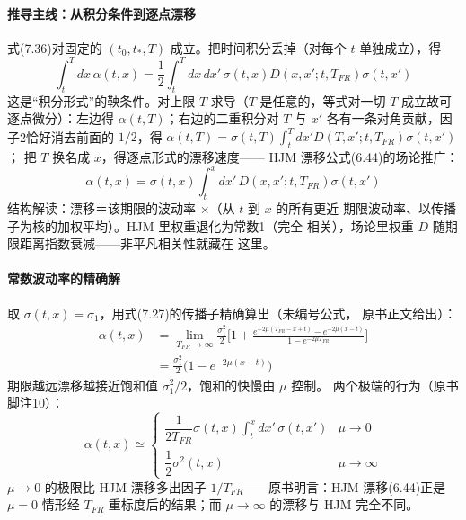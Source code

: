 \paragraph{推导主线：从积分条件到逐点漂移}
式(7.36)对固定的 $(t_0,t_*,T)$ 成立。把时间积分丢掉（对每个 $t$
单独成立），得
\begin{equation*}
\int_{t}^{T}dx\,\alpha(t,x)=\frac{1}{2}\int_{t}^{T}dx\,dx'\,
\sigma(t,x)D(x,x';t,T_{FR})\sigma(t,x')
\tag{7.37}
\end{equation*}
这是“积分形式”的鞅条件。对上限 $T$ 求导（$T$ 是任意的，等式对一切
$T$ 成立故可逐点微分）：左边得 $\alpha(t,T)$；右边的二重积分对 $T$
与 $x'$ 各有一条对角贡献，因子2恰好消去前面的 $1/2$，得
$\alpha(t,T)=\sigma(t,T)\int_t^{T}dx'D(T,x';t,T_{FR})\sigma(t,x')$；
把 $T$ 换名成 $x$，得逐点形式的漂移速度——
HJM 漂移公式(6.44)的场论推广：
\begin{equation*}
\alpha(t,x)=\sigma(t,x)\int_{t}^{x}dx'\,
D(x,x';t,T_{FR})\sigma(t,x')
\tag{7.38}
\end{equation*}
结构解读：漂移＝该期限的波动率 $\times$（从 $t$ 到 $x$ 的所有更近
期限波动率、以传播子为核的加权平均）。HJM 里权重退化为常数1（完全
相关），场论里权重 $D$ 随期限距离指数衰减——非平凡相关性就藏在
这里。

\paragraph{常数波动率的精确解}
取 $\sigma(t,x)=\sigma_1$，用式(7.27)的传播子精确算出（未编号公式，
原书正文给出）：
\begin{align*}
\alpha(t,x)&=\lim_{T_{FR}\to\infty}\frac{\sigma_1^{2}}{2}
\biggl[1+\frac{e^{-2\mu(T_{FR}-x+t)}-e^{-2\mu(x-t)}}
{1-e^{-2\mu T_{FR}}}\biggr]\\
&=\frac{\sigma_1^{2}}{2}\bigl(1-e^{-2\mu(x-t)}\bigr)
\end{align*}
期限越远漂移越接近饱和值 $\sigma_1^2/2$，饱和的快慢由 $\mu$ 控制。
两个极端的行为（原书脚注10）：
\begin{equation*}
\alpha(t,x)\simeq
\begin{cases}
\dfrac{1}{2T_{FR}}\sigma(t,x)\displaystyle\int_{t}^{x}dx'\,
\sigma(t,x') & \mu\to0\\[10pt]
\dfrac{1}{2}\sigma^{2}(t,x) & \mu\to\infty
\end{cases}
\tag{7.39}
\end{equation*}
$\mu\to0$ 的极限比 HJM 漂移多出因子 $1/T_{FR}$——原书明言：HJM
漂移(6.44)正是 $\mu=0$ 情形经 $T_{FR}$ 重标度后的结果；而
$\mu\to\infty$ 的漂移与 HJM 完全不同。

